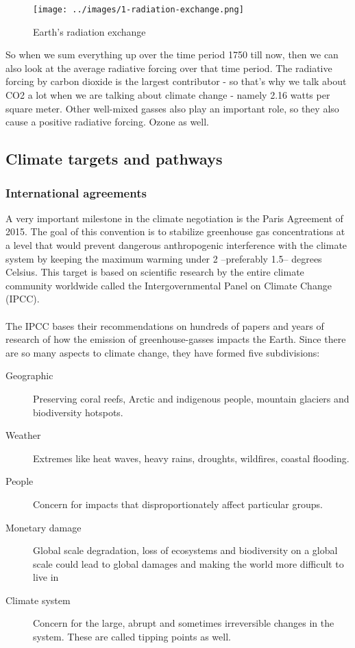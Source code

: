 \documentclass[../summary.tex]{subfiles}
\begin{document}
				\begin{figure}[h]
					\centering
					\texttt{[image: ../images/1-radiation-exchange.png]}
					\caption{Earth's radiation exchange}
					\label{fig:1-radiation-exchange}
				\end{figure}
				\newpage
				So when we sum everything up over the time period 1750 till now, then we can also look at the average radiative forcing over that time period. The radiative forcing by carbon dioxide is the largest contributor - so that's why we talk about CO2 a lot when we are talking about climate change - namely 2.16 watts per square meter. Other well-mixed gasses also play an important role, so they also cause a positive radiative forcing. Ozone as well.
				
		\subsection{Climate targets and pathways}
			\subsubsection{International agreements}
				A very important milestone in the climate negotiation is the Paris Agreement of 2015. The goal of this convention is to stabilize greenhouse gas concentrations at a level that would prevent dangerous anthropogenic interference with the climate system by keeping the maximum warming under 2 --preferably 1.5-- degrees Celsius. This target is based on scientific research by the entire climate community worldwide called the Intergovernmental Panel on Climate Change (IPCC).\\
				\\
				The IPCC bases their recommendations on hundreds of papers and years of research of how the emission of greenhouse-gasses impacts the Earth. Since there are so many aspects to climate change, they have formed five subdivisions:
				\begin{description}
					\item[Geographic] Preserving coral reefs, Arctic and indigenous people, mountain glaciers and biodiversity hotspots.
					\item[Weather] Extremes like heat waves, heavy rains, droughts, wildfires, coastal flooding.
					\item[People] Concern for impacts that disproportionately affect particular groups.
					\item[Monetary damage]  Global scale degradation, loss of ecosystems and biodiversity on a global scale could lead to global damages and making the world more difficult to live in
					\item[Climate system] Concern for the large, abrupt and sometimes irreversible changes in the system. These are called tipping points as well.
				\end{description} 
			
\end{document}
